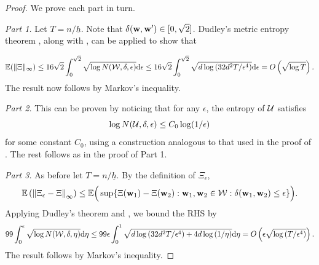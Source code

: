 \documentclass[twoside,11pt]{article}
\begin{document}
\begin{proof}
We prove each part in turn.

{\em Part 1.} 
Let $T = n / \underline h$.
Note that $\delta (\mathbf{w},\mathbf{w}') \in [0,\sqrt 2]$.  Dudley's metric entropy theorem \citep[Th 6.1.2]{marcus2006markov}, along with , can be applied to show that

\[
\mathbb{E} (\|\Xi\|_\infty) 
\le 16 \sqrt 2  \int_0^{\sqrt{2}} \sqrt{ \log N(\mathcal{W}, \delta , \epsilon) } {\rm d}\epsilon 
\le 16 \sqrt 2 \int_0^{\sqrt 2} \sqrt{ d \log \left(32 d^2 T/\epsilon^4\right) } {\rm d} \epsilon 
= O \left(\sqrt{ \log T } \right).
\]
The result now follows by Markov's inequality.

{\em Part 2.} 
This can be proven by noticing that for any $\epsilon$, the entropy of $\mathcal{U}$ satisfies
\[
\log N(\mathcal{U},\delta ,\epsilon) \le C_0 \log (1/\epsilon)
\]
for some constant $C_0$, using a construction analogous to that used in the proof of .
The rest follows as in the proof of Part 1.

{\em Part 3.} 
As before let $T = n / \underline h$.
By the definition of $\Xi_\epsilon$,
\[
\mathbb{E} \left( \left\|\Xi_\epsilon - \Xi \right\|_\infty \right) \le \mathbb{E} \Big( \sup \{ \Xi(\mathbf{w}_1) - \Xi(\mathbf{w}_2) : \mathbf{w}_1, \mathbf{w}_2 \in \mathcal{W} : \delta(\mathbf{w}_1,\mathbf{w}_2) \le \epsilon\} \Big).
\]
Applying Dudley's theorem and , we bound the RHS by
\[
99 \int_0^\epsilon \sqrt{ \log N(\mathcal{W}, \delta , \eta) } {\rm d}\eta 
\le 99 \epsilon \int_0^1 \sqrt{ d \log \left(32 d^2 T/\epsilon^4\right) + 4d \log \left(1/\eta\right)} {\rm d} \eta 
= O \left( \epsilon \sqrt{ \log \left(T/\epsilon^4\right) } \right).
\]
The result follows by Markov's inequality.
\end{proof}
\end{document}
